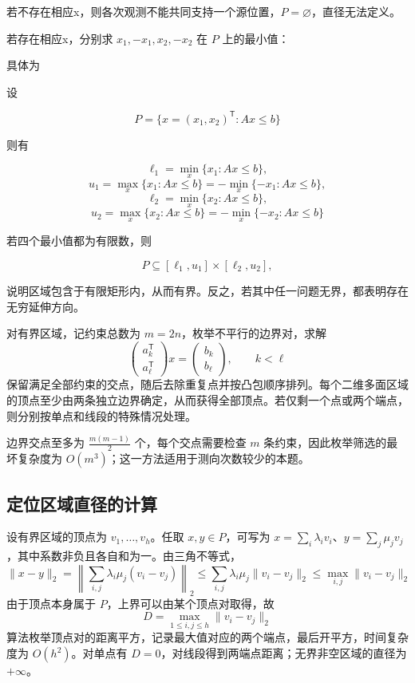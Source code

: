 \documentclass[withoutpreface,bwprint]{cumcmthesis} %
\begin{document}
若不存在相应x，则各次观测不能共同支持一个源位置，$P=\varnothing$，直径无法定义。

若存在相应x，分别求 $x_1,-x_1,x_2,-x_2$ 在 $P$ 上的最小值：

具体为

设

\[
P=\{x=(x_1,x_2)^{\mathsf T}:Ax\le b\}
\]

则有

\[
\ell_1=\min_{x}\{x_1:Ax\le b\},
\]\[
u_1=\max_{x}\{x_1:Ax\le b\}
      =-\min_{x}\{-x_1:Ax\le b\},
\]\[
\ell_2=\min_{x}\{x_2:Ax\le b\},
\]\[
u_2=\max_{x}\{x_2:Ax\le b\}
      =-\min_{x}\{-x_2:Ax\le b\}
\]

若四个最小值都为有限数，则

\[
P\subseteq[\ell_1,u_1]\times[\ell_2,u_2],
\]

说明区域包含于有限矩形内，从而有界。反之，若其中任一问题无界，都表明存在无穷延伸方向。

对有界区域，记约束总数为 $m=2n$，枚举不平行的边界对，求解
\begin{equation}
 \begin{pmatrix}a_k^{\mathsf T}\\a_\ell^{\mathsf T}\end{pmatrix}x
 =\begin{pmatrix}b_k\\b_\ell\end{pmatrix},\qquad k<\ell
\end{equation}
保留满足全部约束的交点，随后去除重复点并按凸包顺序排列。每个二维多面区域的顶点至少由两条独立边界确定，从而获得全部顶点。若仅剩一个点或两个端点，则分别按单点和线段的特殊情况处理。

边界交点至多为 \(\frac{m(m-1)}2\) 个，每个交点需要检查 $m$ 条约束，因此枚举筛选的最坏复杂度为 $O(m^3)$；这一方法适用于测向次数较少的本题。

\subsection{定位区域直径的计算}
设有界区域的顶点为 $v_1,\ldots,v_h$。任取 $x,y\in P$，可写为
$x=\sum_i\lambda_i v_i$、$y=\sum_j\mu_jv_j$，其中系数非负且各自和为一。由三角不等式，
\begin{equation}
 \|x-y\|_2
 =\left\|\sum_{i,j}\lambda_i\mu_j(v_i-v_j)\right\|_2
 \leq\sum_{i,j}\lambda_i\mu_j\|v_i-v_j\|_2
 \leq\max_{i,j}\|v_i-v_j\|_2
\end{equation}
由于顶点本身属于 $P$，上界可以由某个顶点对取得，故
\begin{equation}
 {D=\max_{1\leq i,j\leq h}\|v_i-v_j\|_2}
 \label{eq:b26-diameter}
\end{equation}
算法枚举顶点对的距离平方，记录最大值对应的两个端点，最后开平方，时间复杂度为 $O(h^2)$。对单点有 $D=0$，对线段得到两端点距离；无界非空区域的直径为 $+\infty$。
\end{document}
